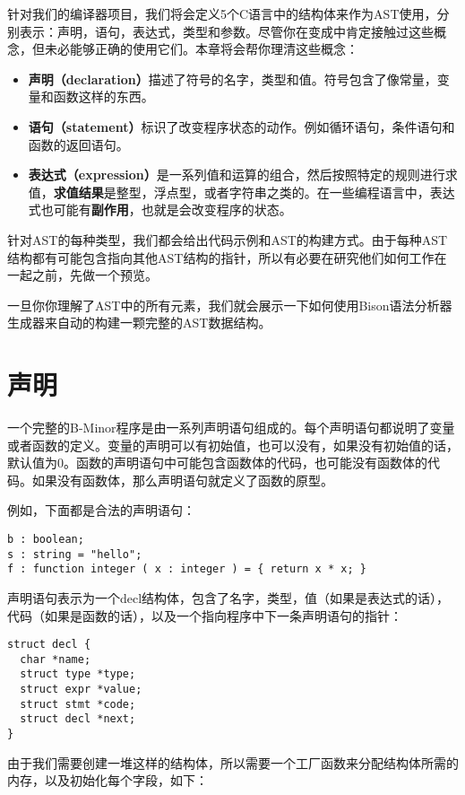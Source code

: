 \documentclass[cn,11pt,chinese]{elegantbook}
\begin{document}
针对我们的编译器项目，我们将会定义5个C语言中的结构体来作为AST使用，分别表示：声明，语句，表达式，类型和参数。尽管你在变成中肯定接触过这些概念，但未必能够正确的使用它们。本章将会帮你理清这些概念：

\begin{itemize}
  \item \textbf{声明（declaration）}描述了符号的名字，类型和值。符号包含了像常量，变量和函数这样的东西。
  \item \textbf{语句（statement）}标识了改变程序状态的动作。例如循环语句，条件语句和函数的返回语句。
  \item \textbf{表达式（expression）}是一系列值和运算的组合，然后按照特定的规则进行求值，\textbf{求值结果}是整型，浮点型，或者字符串之类的。在一些编程语言中，表达式也可能有\textbf{副作用}，也就是会改变程序的状态。
\end{itemize}

针对AST的每种类型，我们都会给出代码示例和AST的构建方式。由于每种AST结构都有可能包含指向其他AST结构的指针，所以有必要在研究他们如何工作在一起之前，先做一个预览。

一旦你你理解了AST中的所有元素，我们就会展示一下如何使用Bison语法分析器生成器来自动的构建一颗完整的AST数据结构。

\section{声明}

一个完整的B-Minor程序是由一系列声明语句组成的。每个声明语句都说明了变量或者函数的定义。变量的声明可以有初始值，也可以没有，如果没有初始值的话，默认值为0。函数的声明语句中可能包含函数体的代码，也可能没有函数体的代码。如果没有函数体，那么声明语句就定义了函数的原型。

例如，下面都是合法的声明语句：

\begin{verbatim}
b : boolean;
s : string = "hello";
f : function integer ( x : integer ) = { return x * x; }
\end{verbatim}

声明语句表示为一个decl结构体，包含了名字，类型，值（如果是表达式的话），代码（如果是函数的话），以及一个指向程序中下一条声明语句的指针：

\begin{verbatim}
struct decl {
  char *name;
  struct type *type;
  struct expr *value;
  struct stmt *code;
  struct decl *next;
}
\end{verbatim}

由于我们需要创建一堆这样的结构体，所以需要一个工厂函数来分配结构体所需的内存，以及初始化每个字段，如下：
\end{document}
